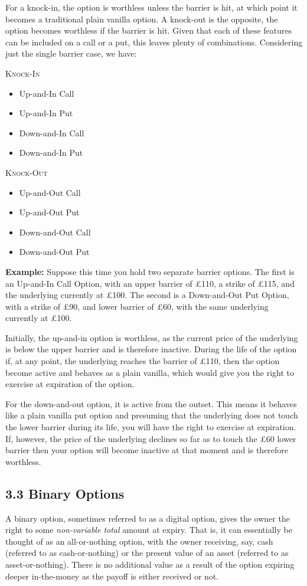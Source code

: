 \documentclass[11pt]{article}
\begin{document}
For a knock-in, the option is worthless unless the barrier is hit, at which point it becomes a traditional plain vanilla option. A knock-out is the opposite, the option becomes worthless if the barrier is hit. Given that each of these features can be included on a call or a put, this leaves plenty of combinations. Considering just the single barrier case, we have:

\textsc{Knock-In}
\begin{itemize}
    \item Up-and-In Call
    \item Up-and-In Put
    \item Down-and-In Call
    \item Down-and-In Put
\end{itemize}

\textsc{Knock-Out}
\begin{itemize}
    \item Up-and-Out Call
    \item Up-and-Out Put
    \item Down-and-Out Call
    \item Down-and-Out Put
\end{itemize}

\textbf{Example:} Suppose this time you hold two separate barrier options. The first is an Up-and-In Call Option, with an upper barrier of £110, a strike of £115, and the underlying currently at £100. The second is a Down-and-Out Put Option, with a strike of £90, and lower barrier of £60, with the same underlying currently at £100.

Initially, the up-and-in option is worthless, as the current price of the underlying is below the upper barrier and is therefore inactive. During the life of the option if, at any point, the underlying reaches the barrier of £110, then the option become active and behaves as a plain vanilla, which would give you the right to exercise at expiration of the option.

For the down-and-out option, it is active from the outset. This means it behaves like a plain vanilla put option and presuming that the underlying does not touch the lower barrier during its life, you will have the right to exercise at expiration. If, however, the price of the underlying declines so far as to touch the £60 lower barrier then your option will become inactive at that moment and is therefore worthless. 

\subsection*{3.3 Binary Options}
A binary option, sometimes referred to as a digital option, gives the owner the right to some \textit{non-variable total} amount at expiry. That is, it can essentially be thought of as an all-or-nothing option, with the owner receiving, say, cash (referred to as cash-or-nothing) or the present value of an asset (referred to as asset-or-nothing). There is no additional value as a result of the option expiring deeper in-the-money as the payoff is either received or not. 
\end{document}
